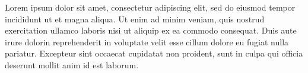 \documentclass{article}
\begin{document}
\beginnumbering
\pstart
Lorem ipsum dolor sit amet, consectetur adipiscing elit, sed do eiusmod tempor incididunt ut \startsub {} et  magna aliqua. Ut enim ad minim veniam, quis nostrud exercitation ullamco laboris nisi ut aliquip ex ea commodo consequat. Duis aute irure dolor\endsub in reprehenderit in voluptate velit esse cillum dolore eu fugiat nulla pariatur. Excepteur sint occaecat cupidatat non proident, sunt in culpa qui officia deserunt mollit anim id est laborum.
\pend
\endnumbering
\end{document}
